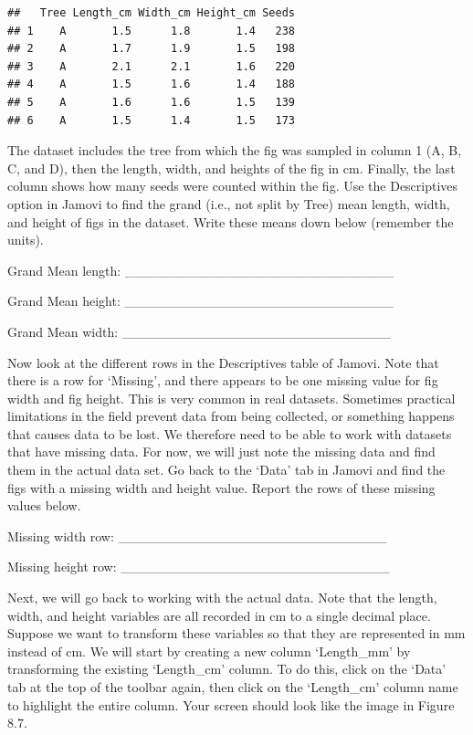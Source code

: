 \documentclass[
]{scrbook}
\begin{document}
\begin{verbatim}
##   Tree Length_cm Width_cm Height_cm Seeds
## 1    A       1.5      1.8       1.4   238
## 2    A       1.7      1.9       1.5   198
## 3    A       2.1      2.1       1.6   220
## 4    A       1.5      1.6       1.4   188
## 5    A       1.6      1.6       1.5   139
## 6    A       1.5      1.4       1.5   173
\end{verbatim}

The dataset includes the tree from which the fig was sampled in column 1 (A, B, C, and D), then the length, width, and heights of the fig in cm.
Finally, the last column shows how many seeds were counted within the fig.
Use the Descriptives option in Jamovi to find the grand (i.e., not split by Tree) mean length, width, and height of figs in the dataset.
Write these means down below (remember the units).

Grand Mean length: \_\_\_\_\_\_\_\_\_\_\_\_\_\_\_\_\_\_\_\_\_\_\_\_\_\_\_\_

Grand Mean height: \_\_\_\_\_\_\_\_\_\_\_\_\_\_\_\_\_\_\_\_\_\_\_\_\_\_\_\_

Grand Mean width: \_\_\_\_\_\_\_\_\_\_\_\_\_\_\_\_\_\_\_\_\_\_\_\_\_\_\_\_

Now look at the different rows in the Descriptives table of Jamovi.
Note that there is a row for `Missing', and there appears to be one missing value for fig width and fig height.
This is very common in real datasets.
Sometimes practical limitations in the field prevent data from being collected, or something happens that causes data to be lost.
We therefore need to be able to work with datasets that have missing data.
For now, we will just note the missing data and find them in the actual data set.
Go back to the `Data' tab in Jamovi and find the figs with a missing width and height value.
Report the rows of these missing values below.

Missing width row: \_\_\_\_\_\_\_\_\_\_\_\_\_\_\_\_\_\_\_\_\_\_\_\_\_\_\_\_

Missing height row: \_\_\_\_\_\_\_\_\_\_\_\_\_\_\_\_\_\_\_\_\_\_\_\_\_\_\_\_

Next, we will go back to working with the actual data.
Note that the length, width, and height variables are all recorded in cm to a single decimal place.
Suppose we want to transform these variables so that they are represented in mm instead of cm.
We will start by creating a new column `Length\_mm' by transforming the existing `Length\_cm' column.
To do this, click on the `Data' tab at the top of the toolbar again, then click on the `Length\_cm' column name to highlight the entire column.
Your screen should look like the image in Figure 8.7.
\end{document}
